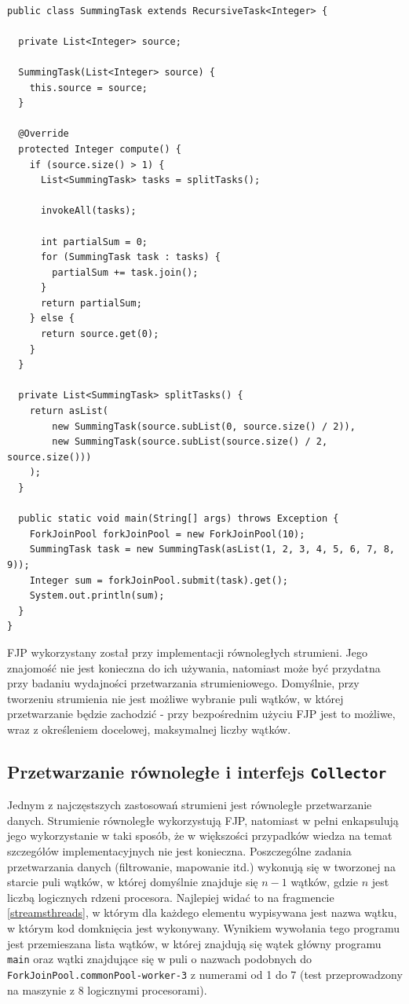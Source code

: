 \documentclass[12pt]{extarticle}
\begin{document}
\begin{lstlisting}[label=fjpexample, caption=Przykładowe wykorzystanie FJP]

public class SummingTask extends RecursiveTask<Integer> {
  
  private List<Integer> source;
  
  SummingTask(List<Integer> source) {
    this.source = source;
  }
  
  @Override
  protected Integer compute() {
    if (source.size() > 1) {
      List<SummingTask> tasks = splitTasks();
      
      invokeAll(tasks);
      
      int partialSum = 0;
      for (SummingTask task : tasks) {
        partialSum += task.join();
      }
      return partialSum;
    } else {
      return source.get(0);
    }
  }
  
  private List<SummingTask> splitTasks() {
    return asList(
        new SummingTask(source.subList(0, source.size() / 2)),
        new SummingTask(source.subList(source.size() / 2, source.size()))
    );
  }
  
  public static void main(String[] args) throws Exception {
    ForkJoinPool forkJoinPool = new ForkJoinPool(10);
    SummingTask task = new SummingTask(asList(1, 2, 3, 4, 5, 6, 7, 8, 9));
    Integer sum = forkJoinPool.submit(task).get();
    System.out.println(sum);
  }
}

\end{lstlisting}

    FJP wykorzystany został przy implementacji równoległych strumieni. Jego znajomość nie jest konieczna do ich używania, natomiast może być przydatna przy badaniu wydajności przetwarzania strumieniowego. Domyślnie, przy tworzeniu strumienia nie jest możliwe wybranie puli wątków, w której przetwarzanie będzie zachodzić - przy bezpośrednim użyciu FJP jest to możliwe, wraz z określeniem docelowej, maksymalnej liczby wątków.

\subsection{Przetwarzanie równoległe i interfejs \texttt{Collector}}

    Jednym z najczęstszych zastosowań strumieni jest równoległe przetwarzanie danych. Strumienie równoległe wykorzystują FJP, natomiast w pełni enkapsulują jego wykorzystanie w taki sposób, że w większości przypadków wiedza na temat szczegółów implementacyjnych nie jest konieczna. Poszczególne zadania przetwarzania danych (filtrowanie, mapowanie itd.) wykonują się w tworzonej na starcie puli wątków, w której domyślnie znajduje się $ n-1 $ wątków, gdzie $ n $ jest liczbą logicznych rdzeni procesora. Najlepiej widać to na fragmencie \ref{streamsthreads}, w którym dla każdego elementu wypisywana jest nazwa wątku, w którym kod domknięcia jest wykonywany.  Wynikiem wywołania tego programu jest przemieszana lista wątków, w której znajdują się wątek główny programu \texttt{main} oraz wątki znajdujące się w puli o nazwach podobnych do \texttt{ForkJoinPool.commonPool-worker-3} z numerami od 1 do 7 (test przeprowadzony na maszynie z 8 logicznymi procesorami).
\end{document}
